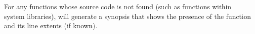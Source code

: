 \documentclass[11pt,twoside,letterpaper]{report}
\begin{document}
For any functions whose source code is not found (such as functions within system libraries), \hpcviewer{} will generate a synopsis that shows the presence of the function and its line extents (if known).







\end{document}
